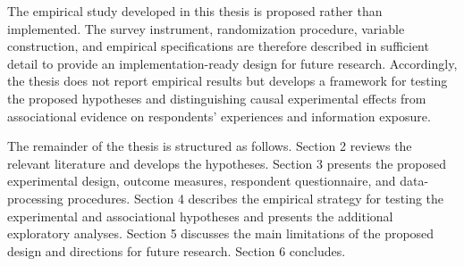 The empirical study developed in this thesis is proposed rather than implemented. The survey instrument, randomization 
procedure, variable construction, and empirical specifications are therefore described in sufficient detail to provide 
an implementation-ready design for future research. Accordingly, the thesis does not report empirical results but 
develops a framework for testing the proposed hypotheses and distinguishing causal experimental effects 
from associational evidence on respondents' experiences and information exposure.

The remainder of the thesis is structured as follows. Section 2 reviews the relevant literature and develops the 
hypotheses. Section 3 presents the proposed experimental design, outcome measures, respondent questionnaire, 
and data-processing procedures. Section 4 describes the empirical strategy for testing the experimental and 
associational hypotheses and presents the additional exploratory analyses. Section 5 discusses the main limitations 
of the proposed design and directions for future research. Section 6 concludes.

